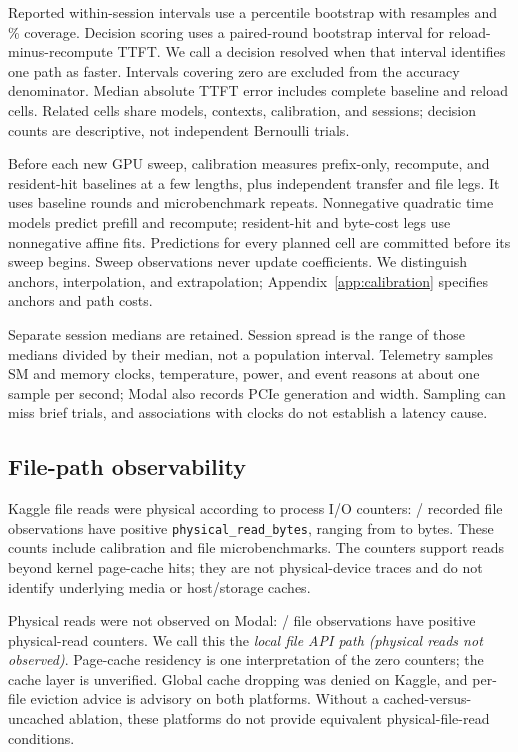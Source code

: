 \documentclass[10pt]{article}
\begin{document}
Reported within-session intervals use a percentile bootstrap with  resamples and \% coverage. Decision scoring uses a paired-round bootstrap interval for reload-minus-recompute TTFT. We call a decision resolved when that interval identifies one path as faster. Intervals covering zero are excluded from the accuracy denominator. Median absolute TTFT error includes complete baseline and reload cells. Related cells share models, contexts, calibration, and sessions; decision counts are descriptive, not independent Bernoulli trials.

Before each new GPU sweep, calibration measures prefix-only, recompute, and resident-hit baselines at a few lengths, plus independent transfer and file legs. It uses  baseline rounds and  microbenchmark repeats. Nonnegative quadratic time models predict prefill and recompute; resident-hit and byte-cost legs use nonnegative affine fits. Predictions for every planned cell are committed before its sweep begins. Sweep observations never update coefficients. We distinguish anchors, interpolation, and extrapolation; Appendix~\ref{app:calibration} specifies anchors and path costs.

Separate session medians are retained. Session spread is the range of those medians divided by their median, not a population interval. Telemetry samples SM and memory clocks, temperature, power, and event reasons at about one sample per second; Modal also records PCIe generation and width. Sampling can miss brief trials, and associations with clocks do not establish a latency cause.

\subsection{File-path observability}\label{sec:files}
Kaggle file reads were physical according to process I/O counters: / recorded file observations have positive \texttt{physical\_read\_bytes}, ranging from  to  bytes. These counts include calibration and file microbenchmarks. The counters support reads beyond kernel page-cache hits; they are not physical-device traces and do not identify underlying media or host/storage caches.

Physical reads were not observed on Modal: / file observations have positive physical-read counters. We call this the \emph{local file API path (physical reads not observed)}. Page-cache residency is one interpretation of the zero counters; the cache layer is unverified. Global cache dropping was denied on Kaggle, and per-file eviction advice is advisory on both platforms. Without a cached-versus-uncached ablation, these platforms do not provide equivalent physical-file-read conditions.
\end{document}
